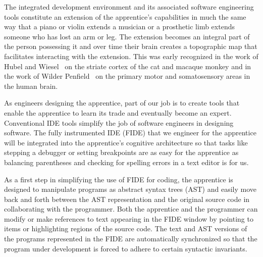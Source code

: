 
The integrated development environment and its associated software engineering tools constitute an extension of the apprentice's capabilities in much the same way that a piano or violin extends a musician or a prosthetic limb extends someone who has lost an arm or leg. The extension becomes an integral part of the person possessing it and over time their brain creates a topographic map that facilitates interacting with the extension. This was early recognized in the work of Hubel and Wiesel~\cite{HubelandWieselJoP-68,HubelandWieselJoP-62} on the striate cortex of the cat and macaque monkey and in the work of Wilder Penfield~\cite{PenfieldandBoldreyBRAIN-37} on the primary motor and somatosensory areas in the human brain.
 
As engineers designing the apprentice, part of our job is to create tools that enable the apprentice to learn its trade and eventually become an expert. Conventional IDE tools simplify the job of software engineers in designing software. The fully instrumented IDE (FIDE) that we engineer for the apprentice will be integrated into the apprentice's cognitive architecture so that tasks like stepping a debugger or setting breakpoints are as easy for the apprentice as balancing parentheses and checking for spelling errors in a text editor is for us.

As a first step in simplifying the use of FIDE for coding, the apprentice is designed to manipulate programs as abstract syntax trees (AST) and easily move back and forth between the AST representation and the original source code in collaborating with the programmer. Both the apprentice and the programmer can modify or make references to text appearing in the FIDE window by pointing to items or highlighting regions of the source code. The text and AST versions of the programs represented in the FIDE are automatically synchronized so that the program under development is forced to adhere to certain syntactic invariants. 


